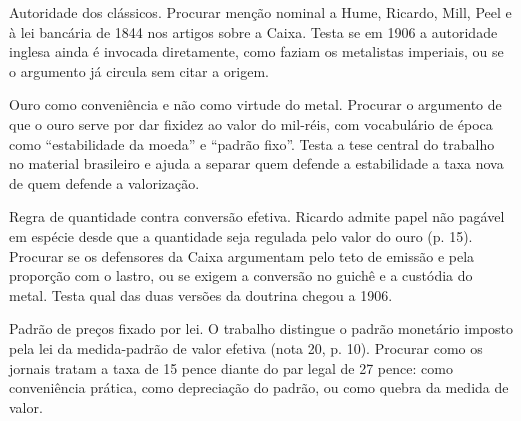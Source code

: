 \begin{dialogo}
\item Autoridade dos clássicos. Procurar menção nominal a Hume, Ricardo, Mill,
Peel e à lei bancária de 1844 nos artigos sobre a Caixa. Testa se em 1906 a
autoridade inglesa ainda é invocada diretamente, como faziam os metalistas
imperiais, ou se o argumento já circula sem citar a origem.

\item Ouro como conveniência e não como virtude do metal. Procurar o argumento
de que o ouro serve por dar fixidez ao valor do mil-réis, com vocabulário de
época como ``estabilidade da moeda'' e ``padrão fixo''. Testa a tese central do
trabalho no material brasileiro e ajuda a separar quem defende a estabilidade a
taxa nova de quem defende a valorização.

\item Regra de quantidade contra conversão efetiva. Ricardo admite papel não
pagável em espécie desde que a quantidade seja regulada pelo valor do ouro (p.
15). Procurar se os defensores da Caixa argumentam pelo teto de emissão e pela
proporção com o lastro, ou se exigem a conversão no guichê e a custódia do
metal. Testa qual das duas versões da doutrina chegou a 1906.

\item Padrão de preços fixado por lei. O trabalho distingue o padrão monetário
imposto pela lei da medida-padrão de valor efetiva (nota 20, p. 10). Procurar
como os jornais tratam a taxa de 15 pence diante do par legal de 27 pence: como
conveniência prática, como depreciação do padrão, ou como quebra da medida de
valor.
\end{dialogo}

